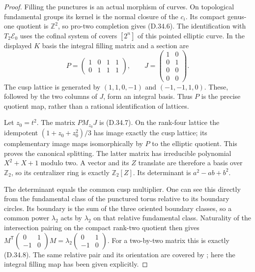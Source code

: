 \begin{proof}
Filling the punctures is an actual morphism of curves. On topological
fundamental groups its kernel is the normal closure of the $c_i$.
Its compact genus-one quotient is $\mathbb Z^2$, so pro-two completion
gives (D.34.6). The identification with $T_2\mathcal E_0$ uses the
cofinal system of covers $[2^n]$ of this pointed elliptic curve. In the
displayed $K$ basis the integral filling matrix and a section are
\[
 P=\begin{pmatrix}1&0&1&1\\0&1&1&1\end{pmatrix},
 \qquad
 J=\begin{pmatrix}1&0\\0&1\\0&0\\0&0\end{pmatrix}.
                                                               \tag{D.34.15}
\]
The cusp lattice is generated by $(1,1,0,-1)$ and $(-1,-1,1,0)$.
These, followed by the two columns of $J$, form an integral basis.
Thus $P$ is the precise quotient map, rather than a rational
identification of lattices.

Let $z_0=t^2$. The matrix $P M_{z_0}J$ is (D.34.7). On the rank-four
lattice the idempotent $(1+z_0+z_0^2)/3$ has image exactly the cusp
lattice; its complementary image maps isomorphically by $P$ to the
elliptic quotient. This proves the canonical splitting. The latter
matrix has irreducible polynomial $X^2+X+1$ modulo two. A vector and
its $Z$ translate are therefore a basis over $\mathbb Z_2$, so its
centralizer ring is exactly $\mathbb Z_2[Z]$. Its determinant is
$a^2-ab+b^2$.

The determinant equals the common cusp multiplier. One can see this
directly from the fundamental class of the punctured torus relative
to its boundary circles. Its boundary is the sum of the three oriented
boundary classes, so a common power $\lambda_2$ acts by $\lambda_2$
on that relative fundamental class. Naturality of the intersection
pairing on the compact rank-two quotient then gives
$M^{\mathsf T}\left(\begin{smallmatrix}0&1\\-1&0\end{smallmatrix}\right)M
=\lambda_2\left(\begin{smallmatrix}0&1\\-1&0\end{smallmatrix}\right)$.
For a two-by-two matrix this is exactly (D.34.8). The same relative
pair and its orientation are covered by
\cite[Theorem 3.3 and \S1.3]{dWilkes2020}; here the integral filling
map has been given explicitly.


\end{proof}
